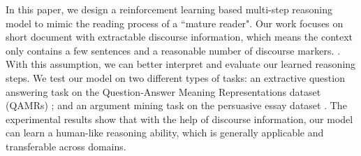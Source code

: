 In this paper, we design a reinforcement learning based multi-step reasoning model to mimic the reading process of a ``mature reader". Our work focuses on short document with extractable discourse information, which means the context only contains a few sentences and a reasonable number of discourse markers. . With this assumption, we can better interpret and evaluate our learned reasoning steps. %
We test our model on two different types of tasks: an extractive question answering task on the Question-Answer Meaning Representations dataset (QAMRs) \cite{DBLP:conf/naacl/MichaelSHDZ18}; and an argument mining task \cite{DBLP:conf/lrec/ReedPRM08} on the persuasive essay dataset \cite{DBLP:conf/coling/StabG14}. The experimental results show that with the help of discourse information, our model can learn a human-like reasoning ability, which is generally applicable and transferable across domains.
